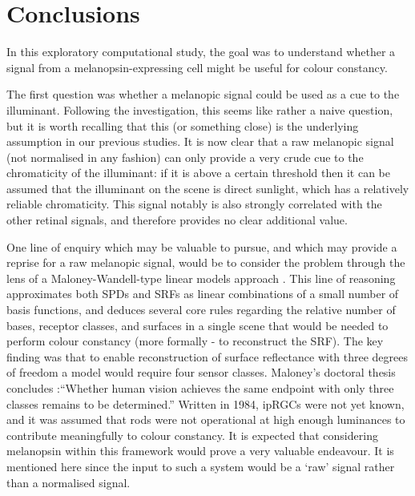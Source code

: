 
\clearpage


\section{Conclusions}

In this exploratory computational study, the goal was to understand whether a signal from a melanopsin-expressing cell might be useful for colour constancy.

The first question was whether a melanopic signal could be used as a cue to the illuminant. Following the investigation, this seems like rather a naive question, but it is worth recalling that this (or something close) is the underlying assumption in our previous studies. It is now clear that a raw melanopic signal (not normalised in any fashion) can only provide a very crude cue to the chromaticity of the illuminant: if it is above a certain threshold then it can be assumed that the illuminant on the scene is direct sunlight, which has a relatively reliable chromaticity. This signal notably is also strongly correlated with the other retinal signals, and therefore provides no clear additional value.

One line of enquiry which may be valuable to pursue, and which may provide a reprise for a raw melanopic signal, would be to consider the problem through the lens of a Maloney-Wandell-type linear models approach \citep{maloney_computational_1984,maloney_color_1986}. This line of reasoning approximates both \glspl{SPD} and \glspl{SRF} as linear combinations of a small number of basis functions, and deduces several core rules regarding the relative number of bases, receptor classes, and surfaces in a single scene that would be needed to perform colour constancy (more formally - to reconstruct the \gls{SRF}). The key finding was that to enable reconstruction of surface reflectance with three degrees of freedom a model would require four sensor classes. Maloney's doctoral thesis concludes :``Whether human vision achieves the same endpoint with only three classes remains to be determined.'' Written in 1984, \glspl{ipRGC} were not yet known, and it was assumed that rods were not operational at high enough luminances to contribute meaningfully to colour constancy. It is expected that considering melanopsin within this framework would prove a very valuable endeavour. It is mentioned here since the input to such a system would be a `raw' signal rather than a normalised signal.

